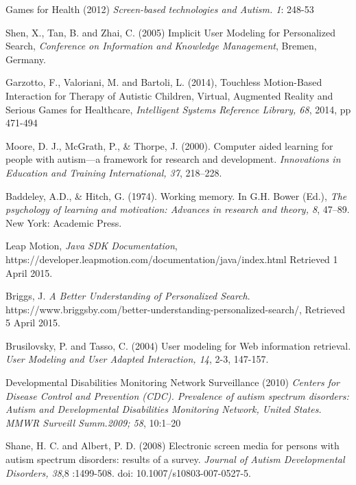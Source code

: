 \documentclass[a4paper, 10pt]{article}
\begin{document}
\begin{thebibliography}{100}

 Games for Health (2012) \textit{Screen-based technologies and Autism. 1}: 248-53

Shen, X., Tan, B. and Zhai, C. (2005) Implicit User Modeling for Personalized Search, \textit{Conference on Information and Knowledge Management}, Bremen, Germany.

 Garzotto, F., Valoriani, M. and Bartoli, L. (2014), Touchless Motion-Based Interaction for Therapy of Autistic Children, Virtual, Augmented Reality and Serious Games for Healthcare, \textit{Intelligent Systems Reference Library, 68}, 2014, pp 471-494

Moore, D. J., McGrath, P., \& Thorpe, J. (2000). Computer aided learning for people with autism—a framework for research and development. \textit{Innovations in Education and Training International, 37}, 218–228.

Baddeley, A.D., \& Hitch, G. (1974). Working memory. In G.H. Bower (Ed.), \textit{The psychology of learning and motivation: Advances in research and theory, 8}, 47–89. New York: Academic Press.

 Leap Motion, \textit{Java SDK Documentation}, \\https://developer.leapmotion.com/documentation/java/index.html Retrieved 1 April 2015.

Briggs, J. \textit{A Better Understanding of Personalized Search}. https://www.briggsby.com/better-understanding-personalized-search/, Retrieved 5 April 2015.

 Brusilovsky, P. and Tasso, C. (2004) User modeling for Web information retrieval. \textit{User Modeling and User Adapted Interaction, 14}, 2-3, 147-157.


Developmental Disabilities Monitoring Network Surveillance (2010) \textit{Centers for Disease Control and Prevention (CDC). Prevalence of autism spectrum disorders: Autism and Developmental Disabilities Monitoring Network, United States. MMWR Surveill Summ.2009; 58}, 10:1–20


Shane, H. C. and Albert, P. D. (2008) Electronic screen media for persons with autism spectrum disorders: results of a survey. \textit{Journal of Autism Developmental Disorders, 38},8 :1499-508. doi: 10.1007/s10803-007-0527-5.


\end{thebibliography}
\end{document}
